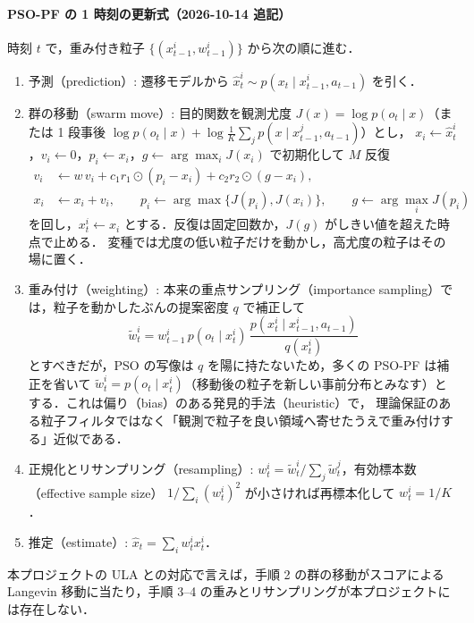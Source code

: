 \documentclass[a4paper,11pt]{article}
\begin{document}
{\color{blue}
\paragraph{PSO-PF の 1 時刻の更新式（2026-10-14 追記）}
時刻 $t$ で，重み付き粒子 $\{(x_{t-1}^i, w_{t-1}^i)\}$ から次の順に進む．
\begin{enumerate}
  \item 予測（prediction）: 遷移モデルから $\hat x_t^i \sim p(x_t \mid x_{t-1}^i, a_{t-1})$ を引く．
  \item 群の移動（swarm move）: 目的関数を観測尤度 $J(x) = \log p(o_t \mid x)$（または 1 段事後 $\log p(o_t \mid x) + \log \tfrac1K \sum_j p(x \mid x_{t-1}^j, a_{t-1})$）とし，
        $x_i \leftarrow \hat x_t^i$，$v_i \leftarrow 0$，$p_i \leftarrow x_i$，$g \leftarrow \arg\max_i J(x_i)$ で初期化して $M$ 反復
        \begin{align}
          v_i &\leftarrow w\, v_i + c_1 r_1 \odot (p_i - x_i) + c_2 r_2 \odot (g - x_i), \\
          x_i &\leftarrow x_i + v_i, \qquad p_i \leftarrow \arg\max\{J(p_i), J(x_i)\}, \qquad g \leftarrow \arg\max_i J(p_i)
        \end{align}
        を回し，$x_t^i \leftarrow x_i$ とする．反復は固定回数か，$J(g)$ がしきい値を超えた時点で止める．
        変種では尤度の低い粒子だけを動かし，高尤度の粒子はその場に置く．
  \item 重み付け（weighting）: 本来の重点サンプリング（importance sampling）では，粒子を動かしたぶんの提案密度 $q$ で補正して
        \begin{equation}
          \tilde w_t^i = w_{t-1}^i \, p(o_t \mid x_t^i)\, \frac{p(x_t^i \mid x_{t-1}^i, a_{t-1})}{q(x_t^i)}
        \end{equation}
        とすべきだが，PSO の写像は $q$ を陽に持たないため，多くの PSO-PF は補正を省いて
        $\tilde w_t^i = p(o_t \mid x_t^i)$（移動後の粒子を新しい事前分布とみなす）とする．これは偏り（bias）のある発見的手法（heuristic）で，
        理論保証のある粒子フィルタではなく「観測で粒子を良い領域へ寄せたうえで重み付けする」近似である．
  \item 正規化とリサンプリング（resampling）: $w_t^i = \tilde w_t^i / \sum_j \tilde w_t^j$，有効標本数（effective sample size）
        $1 / \sum_i (w_t^i)^2$ が小さければ再標本化して $w_t^i = 1/K$．
  \item 推定（estimate）: $\hat x_t = \sum_i w_t^i x_t^i$．
\end{enumerate}
本プロジェクトの ULA との対応で言えば，手順 2 の群の移動がスコアによる Langevin 移動に当たり，手順 3--4 の重みとリサンプリングが本プロジェクトには存在しない．
}
\end{document}
